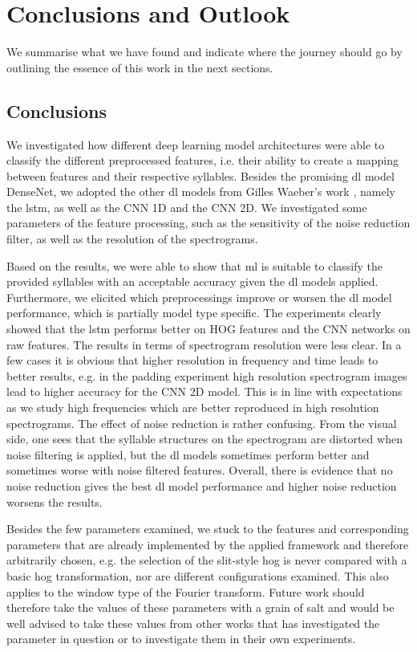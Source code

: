 \chapter{Conclusions and Outlook}
\label{ch:conclusions}
We summarise what we have found and indicate where the journey should go by outlining the essence of this work in the next sections.

\section{Conclusions}
We investigated how different deep learning model architectures were able to classify the different preprocessed features, i.e. their ability to create a mapping between features and their respective syllables. Besides the promising \gls{dl} model DenseNet, we adopted the other \gls{dl} models from Gilles Waeber's work \cite{Waeber2019BirdLearning}, namely the \gls{lstm}, as well as the CNN 1D and the CNN 2D.
We investigated some parameters of the feature processing, such as the sensitivity of the noise reduction filter, as well as the resolution of the spectrograms.

Based on the results, we were able to show that \gls{ml} is suitable to classify the provided syllables with an acceptable accuracy given the \gls{dl} models applied. Furthermore, we elicited which preprocessings improve or worsen the \gls{dl} model performance, which is partially model type specific.
The experiments clearly showed that the \gls{lstm} performs better on HOG features and the CNN networks on raw features. The results in terms of spectrogram resolution were less clear. In a few cases it is obvious that higher resolution in frequency and time leads to better results, e.g. in the padding experiment high resolution spectrogram images lead to higher accuracy for the CNN 2D model. This is in line with expectations as we study high frequencies which are better reproduced in high resolution spectrograms.
The effect of noise reduction is rather confusing. 
From the visual side, one sees that the syllable structures on the spectrogram are distorted when noise filtering is applied, but the \gls{dl} models sometimes perform better and sometimes worse with noise filtered features. 
Overall, there is evidence that no noise reduction gives the best \gls{dl} model performance and higher noise reduction worsens the results.

Besides the few parameters examined, we stuck to the features and corresponding parameters that are already implemented by the applied framework and therefore arbitrarily chosen, e.g. the selection of the slit-style \gls{hog} is never compared with a basic \gls{hog} transformation, nor are different configurations examined. 
This also applies to the window type of the Fourier transform.
Future work should therefore take the values of these parameters with a grain of salt and would be well advised to take these values from other works that has investigated the parameter in question or to investigate them in their own experiments.

